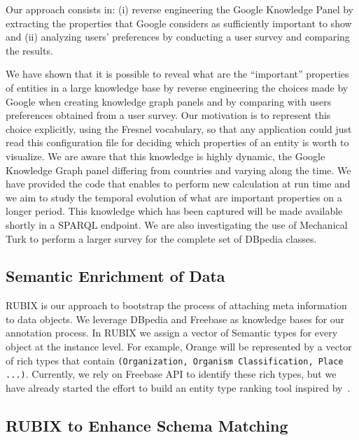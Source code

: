 \documentclass[onecolumn, crcready]{../../Util/LaTEX/iosart2c}
\begin{document}
Our approach consists in: (i) reverse engineering the Google Knowledge Panel by extracting the properties that Google considers as sufficiently important to show and (ii) analyzing users' preferences by conducting a user survey and comparing the results.

We have shown that it is possible to reveal what are the ``important'' properties of entities in a large knowledge base by reverse engineering the choices made by Google when creating knowledge graph panels and by comparing with users preferences obtained from a user survey. Our motivation is to represent this choice explicitly, using the Fresnel vocabulary, so that any application could just read this configuration file for deciding which properties of an entity is worth to visualize. We are aware that this knowledge is highly dynamic, the Google Knowledge Graph panel differing from countries and varying along the time. We have provided the code that enables to perform new calculation at run time and we aim to study the temporal evolution of what are important properties on a longer period. This knowledge which has been captured will be made available shortly in a SPARQL endpoint. We are also investigating the use of Mechanical Turk to perform a larger survey for the complete set of DBpedia classes.

\subsection{Semantic Enrichment of Data}

RUBIX is our approach to bootstrap the process of attaching meta information to data objects. We leverage DBpedia and Freebase as knowledge bases for our annotation process. In RUBIX we assign a vector of Semantic types for every object at the instance level. For example, Orange will be represented by a vector of rich types that contain \texttt{(Organization, Organism Classification, Place ...)}. Currently, we rely on Freebase API to identify these rich types, but we have already started the effort to build an entity type ranking tool inspired by~\cite{Tonon:ISWC:13}.

\subsection{RUBIX to Enhance Schema Matching}
\end{document}
